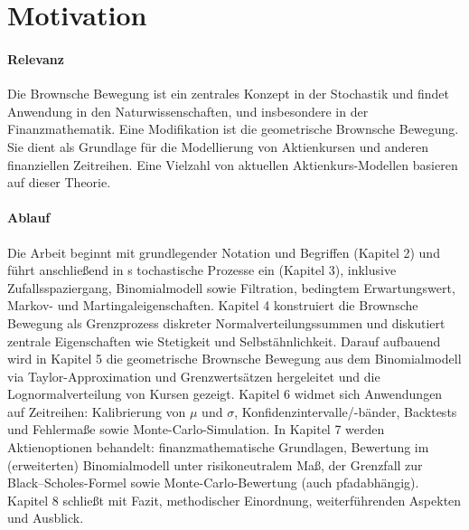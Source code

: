 \section{Motivation}

\paragraph{Relevanz}
Die Brownsche Bewegung ist ein zentrales Konzept in der Stochastik und findet Anwendung in den Naturwissenschaften, und insbesondere in der Finanzmathematik. Eine Modifikation ist die geometrische Brownsche Bewegung. 
Sie dient als Grundlage für die Modellierung von Aktienkursen und anderen finanziellen Zeitreihen. Eine Vielzahl von
aktuellen Aktienkurs-Modellen basieren auf dieser Theorie.

\paragraph{Ablauf}
Die Arbeit beginnt mit grundlegender Notation und Begriffen (Kapitel 2) und führt anschließend in s
tochastische Prozesse ein (Kapitel 3), inklusive Zufallsspaziergang, Binomialmodell sowie Filtration, 
bedingtem Erwartungswert, Markov- und Martingaleigenschaften. Kapitel 4 konstruiert die Brownsche Bewegung 
als Grenzprozess diskreter Normalverteilungssummen und diskutiert zentrale Eigenschaften wie Stetigkeit und 
Selbstähnlichkeit. Darauf aufbauend wird in Kapitel 5 die geometrische Brownsche Bewegung aus dem Binomialmodell 
via Taylor-Approximation und Grenzwertsätzen hergeleitet und die Lognormalverteilung von Kursen gezeigt. 
Kapitel 6 widmet sich Anwendungen auf Zeitreihen: Kalibrierung von $\mu$ und $\sigma$, 
Konfidenzintervalle/-bänder, Backtests und Fehlermaße sowie Monte-Carlo-Simulation. In 
Kapitel 7 werden Aktienoptionen behandelt: finanzmathematische Grundlagen, Bewertung im 
(erweiterten) Binomialmodell unter risikoneutralem Maß, der Grenzfall zur Black–Scholes-Formel sowie 
Monte-Carlo-Bewertung (auch pfadabhängig). Kapitel 8 schließt mit Fazit, methodischer Einordnung, 
weiterführenden Aspekten und Ausblick.

